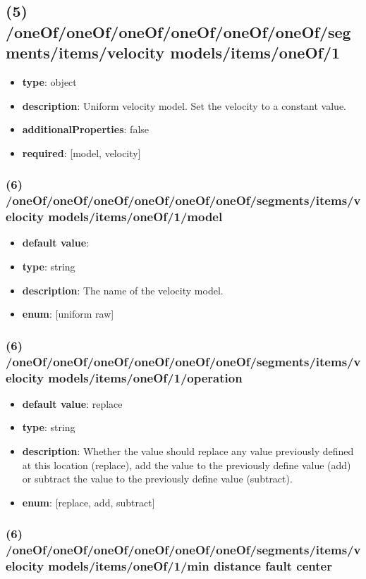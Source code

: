 \subsection{(5) /oneOf/oneOf/oneOf/oneOf/oneOf/oneOf/segments/items/velocity models/items/oneOf/1}
\begin{itemize}[leftmargin=5em]\item {\bf type}: object
\item {\bf description}: Uniform velocity model. Set the velocity to a constant value.
\item {\bf additionalProperties}: false
\item {\bf required}: [model, velocity]\end{itemize}
\subsubsection{(6) /oneOf/oneOf/oneOf/oneOf/oneOf/oneOf/segments/items/velocity models/items/oneOf/1/model}
\begin{itemize}[leftmargin=6em]\item {\bf default value}: 
\item {\bf type}: string
\item {\bf description}: The name of the velocity model.
\item {\bf enum}: [uniform raw]\end{itemize}\subsubsection{(6) /oneOf/oneOf/oneOf/oneOf/oneOf/oneOf/segments/items/velocity models/items/oneOf/1/operation}
\begin{itemize}[leftmargin=6em]\item {\bf default value}: replace
\item {\bf type}: string
\item {\bf description}: Whether the value should replace any value previously defined at this location (replace), add the value to the previously define value (add) or subtract the value to the previously define value (subtract).
\item {\bf enum}: [replace, add, subtract]\end{itemize}\subsubsection{(6) /oneOf/oneOf/oneOf/oneOf/oneOf/oneOf/segments/items/velocity models/items/oneOf/1/min distance fault center}
